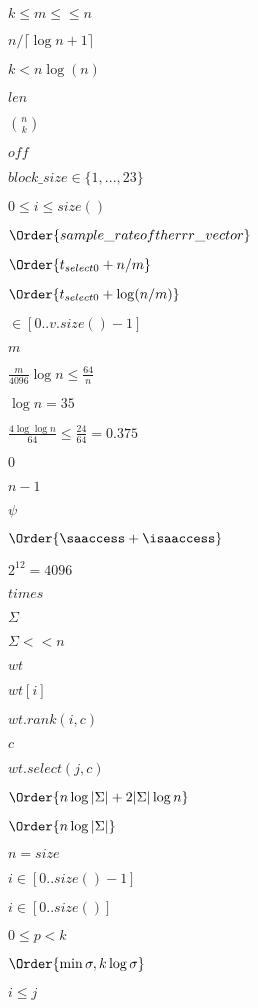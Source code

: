 \documentclass{article}
\begin{document}
$ k\leq m\leq \leq n$
\pagebreak

$ n/\lceil\log{n+1}\rceil $
\pagebreak

$ k<n\log(n) $
\pagebreak

$len$
\pagebreak

${n \choose k}$
\pagebreak

$ off $
\pagebreak

$ block\_size \in \{1,...,23\} $
\pagebreak

$0\leq i \leq size()$
\pagebreak

$ \Order{ sample\_rate of the rrr\_vector} $
\pagebreak

$ \Order{t_{select0} + n/m} $
\pagebreak

$\Order{t_{select0}+\log(n/m)}$
\pagebreak

$\in [0..v.size()-1]$
\pagebreak

$ m $
\pagebreak

$\frac{m}{4096} \log{n} \leq \frac{64}{n}$
\pagebreak

$ \log n = 35 $
\pagebreak

$ \frac{4\log\log n}{64} \leq \frac{24}{64} = 0.375$
\pagebreak

$0$
\pagebreak

$n-1$
\pagebreak

$\psi$
\pagebreak

$ \Order{\saaccess+\isaaccess} $
\pagebreak

$ 2^{12}=4096 $
\pagebreak

$times$
\pagebreak

$\Sigma$
\pagebreak

$\Sigma << n$
\pagebreak

$wt$
\pagebreak

$wt[i]$
\pagebreak

$wt.rank(i,c)$
\pagebreak

$c$
\pagebreak

$wt.select(j,c)$
\pagebreak

$\Order{n\log|\Sigma| + 2|\Sigma|\log n}$
\pagebreak

$ \Order{n\log|\Sigma|}$
\pagebreak

$n=size$
\pagebreak

$i \in [0..size()-1]$
\pagebreak

$i\in[0..size()]$
\pagebreak

$ 0 \leq p < k $
\pagebreak

$ \Order{\min{\sigma, k \log \sigma}} $
\pagebreak

$ i\leq j $
\pagebreak
\end{document}
